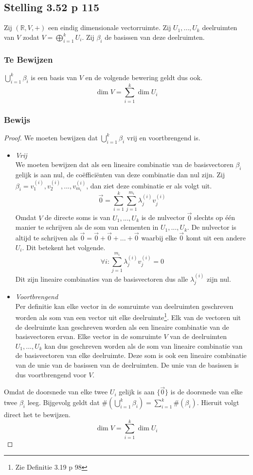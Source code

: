 \documentclass[lineaire_algebra_oplossingen.tex]{subfiles}
\begin{document}
\subsection{Stelling 3.52 p 115}
\label{3.52}
Zij $(\mathbb{R},V,+)$ een eindig dimensionale vectorruimte. Zij $U_1,...,U_k$ deelruimten van $V$ zodat $V=\bigoplus_{i=1}^kU_i$. Zij $\beta_i$ de basissen van deze deelruimten.

\subsubsection*{Te Bewijzen}
$\bigcup_{i=1}^k\beta_i$ is een basis van $V$ en de volgende bewering geldt dus ook.
\[
\dim V = \sum_{i=1}^k\dim U_i
\]

\subsubsection*{Bewijs}
\begin{proof}
We moeten bewijzen dat $\bigcup_{i=1}^k\beta_i$ vrij en voortbrengend is.
\begin{itemize}
\item \emph{Vrij}\\
We moeten bewijzen dat als een lineaire combinatie van de basisvectoren $\beta_i$ gelijk is aan nul, de co\"effici\"enten van deze combinatie dan nul zijn. Zij $\beta_i = {v_1^{(i)},v_2^{(i)},...,v_{m_i}^{(i)}}$, dan ziet deze combinatie er als volgt uit.
\[
\vec{0} = \sum_{i=1}^k\sum_{j=1}^{m_i}\lambda_j^{(i)}v_j^{(i)}
\]
Omdat $V$ de directe soms is van $U_1,...,U_k$ is de nulvector $\vec{0}$ slechts op \'e\'en manier te schrijven als de som van elementen in $U_1,...,U_k$. De nulvector is altijd te schrijven als $\vec{0} = \vec{0} + \vec{0} + ... + \vec{0}$ waarbij elke $\vec{0}$ komt uit een andere $U_i$. Dit betekent het volgende.
\[
\forall i: \sum_{j=1}^{m_i}\lambda_j^{(i)}v_j^{(i)} = 0
\]
Dit zijn lineaire combinaties van de basisvectoren dus alle $\lambda_j^{(i)}$ zijn nul.
\item \emph{Voortbrengend}\\
Per definitie kan elke vector in de somruimte van deelruimten geschreven worden als som van een vector uit elke deelruimte\footnote{Zie Definitie 3.19 p 98}.
Elk van de vectoren uit de deelruimte kan geschreven worden als een lineaire combinatie van de basisvectoren ervan. Elke vector in de somruimte $V$ van de deelruimten $U_1,...,U_k$ kan dus geschreven worden als de som van lineaire combinatie van de basisvectoren van elke deelruimte. Deze som is ook een lineaire combinatie van de unie van de basissen van de deelruimten. De unie van de basissen is dus voortbrengend voor $V$.
\end{itemize}
Omdat de doorsnede van elke twee $U_i$ gelijk is aan $\{\vec{0}\}$ is de doorsnede van elke twee $\beta_i$ leeg. Bijgevolg geldt dat $\#(\bigcup_{i=1}^k\beta_i) = \sum_{i=1}^k\#(\beta_i)$. Hieruit volgt direct het te bewijzen.
\[
\dim V = \sum_{i=1}^k\dim U_i
\]
\end{proof}
\end{document}
